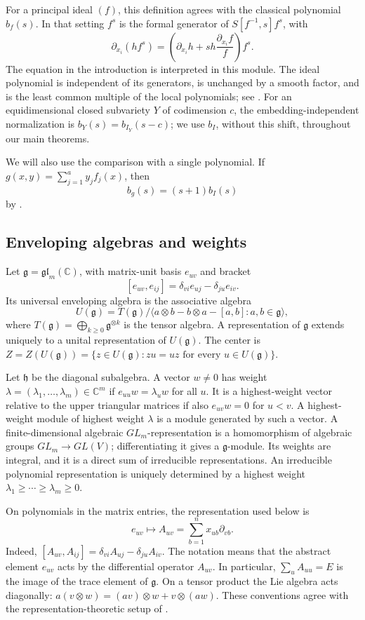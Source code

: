\documentclass[11pt,a4paper]{article}
\numberwithin{equation}{section}
\theoremstyle{definition}
\newcommand{\C}{\mathbb C}
\newcommand{\g}{\mathfrak g}
\begin{document}
For a principal ideal $(f)$, this definition agrees with the
classical polynomial $b_f(s)$. In that setting $f^s$ is the formal
generator of $S[f^{-1},s]f^s$, with
\[
\partial_{x_i}(h f^s)=
\left(\partial_{x_i}h+s h\frac{\partial_{x_i}f}{f}\right)f^s.
\]
The equation in the introduction is interpreted in this module.
The ideal polynomial is independent of its generators, is unchanged
by a smooth factor, and is the least common multiple of the local
polynomials; see \cite[Sections~2.4--2.5]{BMS}. For an equidimensional
closed subvariety $Y$ of codimension $c$, the embedding-independent
normalization is $b_Y(s)=b_{I_Y}(s-c)$; we use $b_I$, without this
shift, throughout our main theorems.

We will also use the comparison with a single polynomial. If
$g(x,y)=\sum_{j=1}^a y_j f_j(x)$, then
\begin{equation}\label{eq:mustata}
b_g(s)=(s+1)b_I(s)
\end{equation}
by \cite[Theorem~1.1]{Mustata}.

\subsection{Enveloping algebras and weights}\label{subsec:weights}
Let $\g=\mathfrak{gl}_m(\C)$, with matrix-unit basis $e_{uv}$ and
bracket
\[
[e_{uv},e_{ij}]=\delta_{vi}e_{uj}-\delta_{ju}e_{iv}.
\]
Its universal enveloping algebra is the associative algebra
\[
U(\g)=T(\g)/\langle a\otimes b-b\otimes a-[a,b]:a,b\in\g\rangle,
\]
where $T(\g)=\bigoplus_{k\ge0}\g^{\otimes k}$ is the tensor algebra.
A representation of $\g$ extends uniquely to a unital representation
of $U(\g)$. The center is
$Z=Z(U(\g))=\{z\in U(\g):zu=uz\text{ for every }u\in U(\g)\}$.

Let $\mathfrak h$ be the diagonal subalgebra. A vector $w\ne0$ has
weight $\lambda=(\lambda_1,\ldots,\lambda_m)\in\C^m$ if
$e_{uu}w=\lambda_u w$ for all $u$. It is a highest-weight vector
relative to the upper triangular matrices if also $e_{uv}w=0$ for
$u<v$. A highest-weight module of highest weight $\lambda$ is a
module generated by such a vector. A finite-dimensional algebraic
$GL_m$-representation is a homomorphism of algebraic groups
$GL_m\to GL(V)$; differentiating it gives a $\g$-module. Its weights
are integral, and it is a direct sum of irreducible representations.
An irreducible polynomial representation is uniquely determined
by a highest weight $\lambda_1\ge\cdots\ge\lambda_m\ge0$.

On polynomials in the matrix entries, the representation used below is
\begin{equation}\label{eq:rowaction}
e_{uv}\longmapsto A_{uv}=\sum_{b=1}^n x_{ub}\partial_{vb}.
\end{equation}
Indeed, $[A_{uv},A_{ij}]=\delta_{vi}A_{uj}-\delta_{ju}A_{iv}$.
The notation means that the abstract element $e_{uv}$ acts by the
differential operator $A_{uv}$. In particular,
$\sum_u A_{uu}=E$ is the image of the trace element of $\g$.
On a tensor product the Lie algebra acts diagonally:
$a(v\otimes w)=(av)\otimes w+v\otimes(aw)$.
These conventions agree with the representation-theoretic setup of
\cite[Sections~2.1--2.3]{LRWW}.
\end{document}
